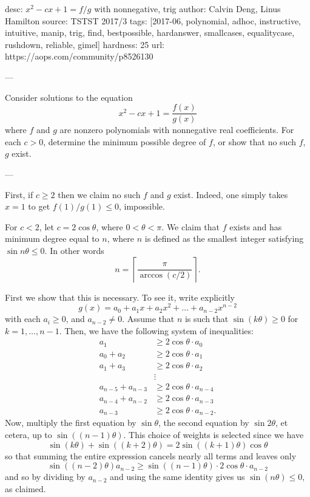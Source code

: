 desc: $x^2-cx+1 = f/g$ with nonnegative, trig
author: Calvin Deng, Linus Hamilton
source: TSTST 2017/3
tags: [2017-06, polynomial, adhoc, instructive, intuitive, manip, trig, find, bestpossible,
  hardanswer, smallcases, equalitycase, rushdown, reliable, gimel]
hardness: 25
url: https://aops.com/community/p8526130

---

Consider solutions to the equation
\[ x^2 - cx + 1 = \frac{f(x)}{g(x)} \]
where $f$ and $g$ are nonzero polynomials with nonnegative real coefficients.
For each $c > 0$, determine the minimum possible degree of $f$, or show
that no such $f$, $g$ exist.

---

First, if $c \ge 2$ then we claim no such $f$ and $g$ exist.
Indeed, one simply takes $x=1$ to get $f(1)/g(1) \le 0$, impossible.

For $c < 2$, let $c = 2 \cos \theta$, where $0 < \theta < \pi$.
We claim that $f$ exists and has minimum degree equal to $n$,
where $n$ is defined as the smallest integer
satisfying $\sin n\theta \le 0$.
In other words
\[ n = \left\lceil \frac{\pi}{\arccos(c/2)} \right\rceil. \]

First we show that this is necessary.
To see it, write explicitly
\[ g(x) = a_0 + a_1 x + a_2 x^2 + \dots + a_{n-2} x^{n-2} \]
with each $a_i \ge 0$, and $a_{n-2} \neq 0$.
Assume that $n$ is such that $\sin(k\theta) \ge 0$ for $k=1,\dots,n-1$.
Then, we have the following system of inequalities:
\begin{align*}
  a_1 &\ge 2 \cos \theta \cdot a_0 \\
  a_0 + a_2 &\ge 2 \cos \theta \cdot a_1 \\
  a_1 + a_3 &\ge 2 \cos \theta \cdot a_2 \\
  &\vdots \\
  a_{n-5} + a_{n-3} &\ge 2 \cos \theta \cdot a_{n-4} \\
  a_{n-4} + a_{n-2} &\ge 2 \cos \theta \cdot a_{n-3} \\
  a_{n-3} &\ge 2 \cos \theta \cdot a_{n-2}.
\end{align*}
Now, multiply the first equation by $\sin\theta$,
the second equation by $\sin2\theta$, et cetera,
up to $\sin\left( (n-1)\theta \right)$.
This choice of weights is selected since we have
\[ \sin \left( k\theta \right) + \sin\left( (k+2)\theta \right)
  = 2 \sin\left( (k+1)\theta \right) \cos \theta \]
so that summing the entire expression
cancels nearly all terms and leaves only
\[ \sin\left( (n-2)\theta \right) a_{n-2}
  \ge \sin\left( (n-1)\theta  \right) \cdot 2\cos\theta \cdot a_{n-2} \]
and so by dividing by $a_{n-2}$ and using the same identity
gives us $\sin(n\theta) \le 0$, as claimed.

